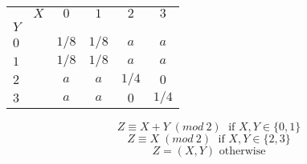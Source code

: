 
		\begin{center}
		\begin{tabular}{|l r||c|c|c|c|}
		    \hline 
		    		 &	$X$ & $0$ & $1$ & $2$ & $3$ \\ 
		    $Y$ &		  &		&			&			&		\\
		    \hline 
		    \hline
		    $0$ &		   & $1/8$ & $1/8$ & $a$ & $a$ \\ 
		    \hline 
		    $1$ &		   & $1/8$ & $1/8$ & $a$ & $a$ \\ 
		    \hline 
		    $2$ &		   & $a$ & $a$ & $1/4$ & $0$ \\ 
		    \hline 
		    $3$ &		   & $a$ & $a$ & $0$ & $1/4$ \\ 
		    \hline 
		  \end{tabular} 
	\end{center}
	
			$$Z \equiv X + Y\; (mod\: 2)\; \text{ if } X,Y \in \{ 0,1\}$$ 
	    	$$Z \equiv X\; (mod\: 2)\; \text{ if } X,Y \in \{ 2,3\}$$ 
	    	$$Z = (X,Y) \text{ otherwise} $$
